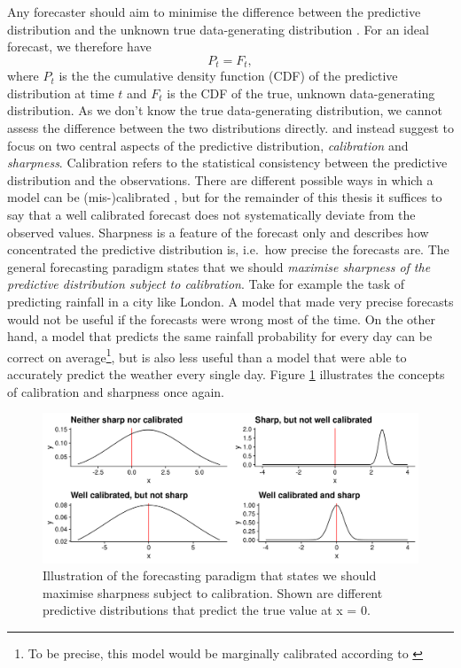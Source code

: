 \documentclass[
]{book}
\begin{document}
Any forecaster should aim to minimise the difference between the predictive distribution and the unknown true data-generating distribution \citep{gneitingProbabilisticForecastsCalibration2007}. For an ideal forecast, we therefore have
\[ P_t = F_t, \]
where \(P_t\) is the the cumulative density function (CDF) of the predictive distribution at time \(t\) and \(F_t\) is the CDF of the true, unknown data-generating distribution. As we don't know the true data-generating distribution, we cannot assess the difference between the two distributions directly. \citet{gneitingCalibratedProbabilisticForecasting2005} and \citet{gneitingProbabilisticForecastsCalibration2007} instead suggest to focus on two central aspects of the predictive distribution, \emph{calibration} and \emph{sharpness}. Calibration refers to the statistical consistency between the predictive distribution and the observations. There are different possible ways in which a model can be (mis-)calibrated \citep{gneitingProbabilisticForecastsCalibration2007}, but for the remainder of this thesis it suffices to say that a well calibrated forecast does not systematically deviate from the observed values. Sharpness is a feature of the forecast only and describes how concentrated the predictive distribution is, i.e.~how precise the forecasts are. The general forecasting paradigm states that we should \emph{maximise sharpness of the predictive distribution subject to calibration}. Take for example the task of predicting rainfall in a city like London. A model that made very precise forecasts would not be useful if the forecasts were wrong most of the time. On the other hand, a model that predicts the same rainfall probability for every day can be correct on average\footnote{To be precise, this model would be marginally calibrated according to \citet{gneitingProbabilisticForecastsCalibration2007}}, but is also less useful than a model that were able to accurately predict the weather every single day. Figure \ref{fig:forecast-paradigm} illustrates the concepts of calibration and sharpness once again.

\begin{figure}
\includegraphics[width=1\linewidth]{../visualisation/chapter-3-evaluation/forecast-paradigm} \caption{Illustration of the forecasting paradigm that states we should maximise sharpness subject to calibration. Shown are different predictive distributions that predict the true value at x = 0.}\label{fig:forecast-paradigm}
\end{figure}
\end{document}
